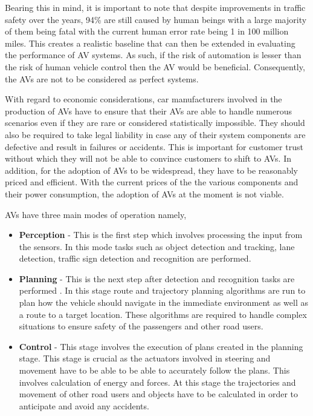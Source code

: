 Bearing this in mind, it is important to note that despite improvements in traffic safety over the years, 94\% are still caused by human beings with a large majority of them being fatal with the current human error rate being 1 in 100 million miles. This creates a realistic baseline that can then be extended in evaluating the performance of AV systems. As such, if the risk of automation is lesser than the risk of human vehicle control then the AV would be beneficial. Consequently, the AVs are not to be considered as perfect systems.

With regard to economic considerations, car manufacturers involved in the production of AVs have to ensure that their AVs are able to handle numerous scenarios even if they are rare or considered statistically impossible. They should also be required to take legal liability in case any of their system components are defective and result in failures or accidents. This is important for customer trust without which they will not be able to convince customers to shift to AVs. In addition, for the adoption of AVs to be widespread, they have to be reasonably priced and efficient. With the current prices of the the various components and their power consumption, the adoption of AVs at the moment is not viable. 



AVs have three main modes of operation namely,
\begin{itemize}
	\item \textbf{Perception} - This is the first step which involves processing the input from the sensors. In this mode tasks such as object detection and tracking, lane detection, traffic sign detection and recognition are performed.
	\item \textbf{Planning} - This is the next step after detection and recognition tasks are performed . In this stage route and trajectory planning algorithms are run  to plan how the vehicle should navigate in the immediate environment as well as a route to a target location. These algorithms are required to handle complex situations to ensure safety of the passengers and other road users. 
	\item \textbf{Control} - This stage involves the execution of plans created in the planning stage. This stage is crucial as the actuators involved in steering and movement have to be able to be able to accurately follow the plans. This involves calculation of energy and forces. At this stage the trajectories and movement of other road users and objects have to be calculated in order to anticipate and avoid any accidents. 
	
\end{itemize}



